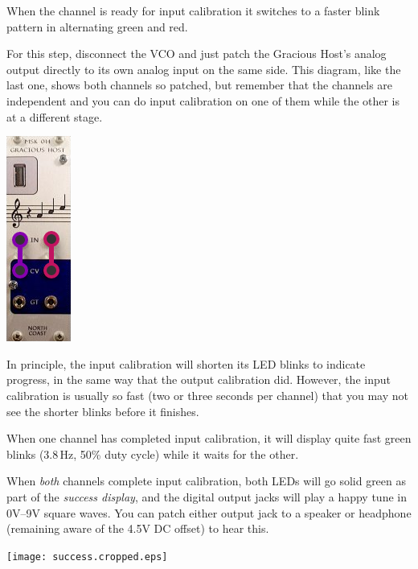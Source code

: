 When the channel is ready for input calibration it switches to a
faster blink pattern in alternating green and red.


For this step, disconnect the VCO and just patch the Gracious Host's analog
output directly to its own analog input on the same side.  This diagram,
like the last one, shows both channels so patched, but remember that the
channels are independent and you can do input calibration on one of them
while the other is at a different stage.

\nopagebreak\noindent
{\hspace*{\fill}\includegraphics[scale=0.45]{calpatch2.png}\hspace*{\fill}\par} 

In principle, the input calibration will shorten its LED blinks to indicate
progress, in the same way that the output calibration did.  However, the
input calibration is usually so fast (two or three seconds per channel) that
you may not see the shorter blinks before it finishes.


When one channel has completed input calibration, it will display quite fast
green blinks (3.8\,Hz, 50\% duty cycle) while it waits for the other.


When \emph{both} channels complete input calibration, both LEDs will go
solid green as part of the \emph{success display}, and the digital output
jacks will play a happy tune in 0V--9V square waves.  You can patch either
output jack to a speaker or headphone (remaining aware of the 4.5V DC
offset) to hear this.

\texttt{[image: success.cropped.eps]}


